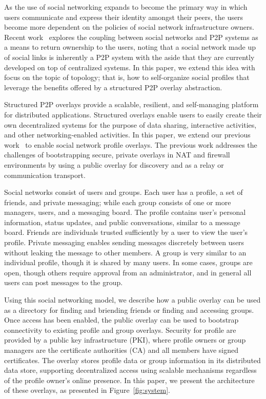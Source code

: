\documentclass[conference]{IEEEtran}
\begin{document}
As the use of social networking expands to become the primary way in which
users communicate and express their identity amongst their peers, the users
become more dependent on the policies of social network infrastructure owners.
Recent work~\cite{p2p_socialnetwork} explores the coupling between social
networks and P2P systems as a means to return ownership to the users, noting
that a social network made up of social links is inherently a P2P system with
the aside that they are currently developed on top of centralized systems.  In
this paper, we extend this idea with focus on the topic of topology; that is,
how to self-organize social profiles that leverage the benefits offered by a
structured P2P overlay abstraction.

Structured P2P overlays provide a scalable, resilient, and self-managing
platform for distributed applications.  Structured overlays enable users to
easily create their own decentralized systems for the purpose of data sharing,
interactive activities, and other networking-enabled activities.  In this
paper, we extend our previous work~\cite{vpo} to enable social network profile
overlays.  The previous work addresses the challenges of bootstrapping secure,
private overlays in NAT and firewall environments by using a public overlay
for discovery and as a relay or communication transport.  

Social networks consist of users and groups.  Each user has a profile, a set
of friends, and private messaging; while each group consists of one or more
managers, users, and a messaging board.  The profile contains user's personal
information, status updates, and public conversations, similar to a message
board.  Friends are individuals trusted sufficiently by a user to view the
user's profile.  Private messaging enables sending messages discretely between
users without leaking the message to other members.  A group is very similar
to an individual profile, though it is shared by many users.  In some cases,
groups are open, though others require approval from an administrator, and in
general all users can post messages to the group.  

Using this social networking model, we describe how a public overlay can be
used as a directory for finding and briending friends or finding and accessing
groups.  Once access has been enabled, the public overlay can be used to
bootstrap connectivity to existing profile and group overlays.  Security for
profile are provided by a public key infrastructure (PKI), where profile
owners or group managers are the certificate authorities (CA) and all members
have signed certificates.  The overlay stores profile data or group
information in its distributed data store, supporting decentralized access
using scalable mechanisms regardless of the profile owner's online presence.
In this paper, we present the architecture of these overlays, as presented in
Figure~\ref{fig:system}.
\end{document}
